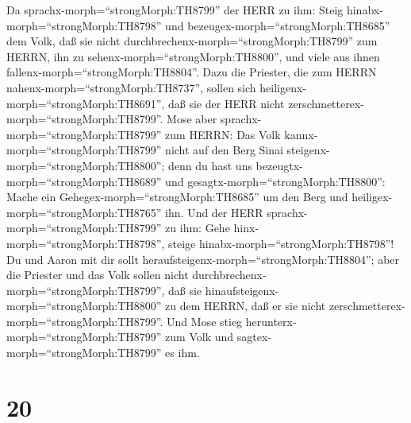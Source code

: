  Da sprachx-morph=``strongMorph:TH8799'' der HERR zu ihm:
Steig hinabx-morph=``strongMorph:TH8798'' und
bezeugex-morph=``strongMorph:TH8685'' dem Volk, daß sie nicht
durchbrechenx-morph=``strongMorph:TH8799'' zum HERRN, ihn zu
sehenx-morph=``strongMorph:TH8800'', und viele aus ihnen
fallenx-morph=``strongMorph:TH8804''.  Dazu die Priester,
die zum HERRN nahenx-morph=``strongMorph:TH8737'', sollen sich
heiligenx-morph=``strongMorph:TH8691'', daß sie der HERR nicht
zerschmetterex-morph=``strongMorph:TH8799''.  Mose aber
sprachx-morph=``strongMorph:TH8799'' zum HERRN: Das Volk
kannx-morph=``strongMorph:TH8799'' nicht auf den Berg Sinai
steigenx-morph=``strongMorph:TH8800''; denn du hast uns
bezeugtx-morph=``strongMorph:TH8689'' und
gesagtx-morph=``strongMorph:TH8800'': Mache ein
Gehegex-morph=``strongMorph:TH8685'' um den Berg und
heiligex-morph=``strongMorph:TH8765'' ihn.  Und der HERR
sprachx-morph=``strongMorph:TH8799'' zu ihm: Gehe
hinx-morph=``strongMorph:TH8798'', steige
hinabx-morph=``strongMorph:TH8798''! Du und Aaron mit dir sollt
heraufsteigenx-morph=``strongMorph:TH8804''; aber die Priester und das
Volk sollen nicht durchbrechenx-morph=``strongMorph:TH8799'', daß sie
hinaufsteigenx-morph=``strongMorph:TH8800'' zu dem HERRN, daß er sie
nicht zerschmetterex-morph=``strongMorph:TH8799''.  Und
Mose stieg herunterx-morph=``strongMorph:TH8799'' zum Volk und
sagtex-morph=``strongMorph:TH8799'' es ihm.

\hypertarget{section-19}{%
\section{20}\label{section-19}}

